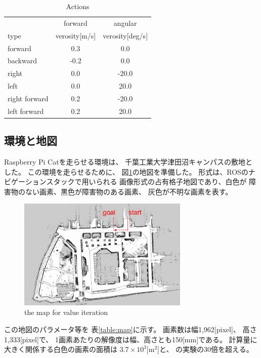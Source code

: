 \documentclass{jarticle}
\begin{document}
\begin{table}[hbtp]
	\caption{Actions}
	\label{table:actions}
	\centering
	\begin{small}
	\begin{tabular}{l|cc}
 		\hline
		& forward & angular \\
 		type & verosity[m/s] & verosity[deg/s] \\
 		\hline \hline
 		forward & 0.3 & 0.0 \\
 		backward & -0.2 & 0.0 \\
 		right & 0.0 & -20.0 \\
 		left & 0.0 & 20.0 \\
 		right forward & 0.2 & -20.0 \\
 		left forward & 0.2 & 20.0 \\
	 \hline
	\end{tabular}
	\end{small}
\end{table}


\subsection{環境と地図}

Raspberry Pi Catを走らせる環境は、
千葉工業大学津田沼キャンパスの敷地とした。
この環境を走らせるために、
図\ref{fig:tsudanuma}の地図を準備した。
形式は、ROSのナビゲーションスタックで用いられる
画像形式の占有格子地図であり、白色が
障害物のない画素、黒色が障害物のある画素、
灰色が不明な画素を表す。

\begin{figure}[htb]
  \centering
   \includegraphics[height=53mm]{./figs/tsudanuma.png}
   \caption{the map for value iteration}
	\label{fig:tsudanuma}
\end{figure}

この地図のパラメータ等を
表\ref{table:map}に示す。
画素数は幅1,962[pixel]、
高さ1,333[pixel]で、
1画素あたりの解像度は幅、高さとも150[mm]である。
計算量に大きく関係する白色の画素の面積は
$3.7\times 10^3$[m$^2$]と、\cite{上田rsj2021}
の実験の30倍を超える。
\end{document}
